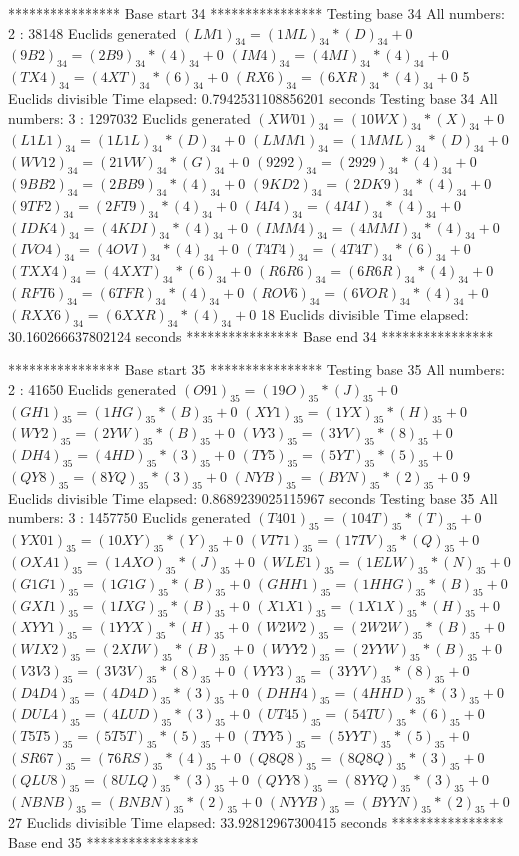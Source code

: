**************** Base start 34 ****************
Testing base 34 All numbers: 2 :
	 38148 Euclids generated
	$(LM1)_{34}=(1ML)_{34}*(D)_{34}+0$
	$(9B2)_{34}=(2B9)_{34}*(4)_{34}+0$
	$(IM4)_{34}=(4MI)_{34}*(4)_{34}+0$
	$(TX4)_{34}=(4XT)_{34}*(6)_{34}+0$
	$(RX6)_{34}=(6XR)_{34}*(4)_{34}+0$
	 5 Euclids divisible
Time elapsed: 0.7942531108856201 seconds
Testing base 34 All numbers: 3 :
	 1297032 Euclids generated
	$(XW01)_{34}=(10WX)_{34}*(X)_{34}+0$
	$(L1L1)_{34}=(1L1L)_{34}*(D)_{34}+0$
	$(LMM1)_{34}=(1MML)_{34}*(D)_{34}+0$
	$(WV12)_{34}=(21VW)_{34}*(G)_{34}+0$
	$(9292)_{34}=(2929)_{34}*(4)_{34}+0$
	$(9BB2)_{34}=(2BB9)_{34}*(4)_{34}+0$
	$(9KD2)_{34}=(2DK9)_{34}*(4)_{34}+0$
	$(9TF2)_{34}=(2FT9)_{34}*(4)_{34}+0$
	$(I4I4)_{34}=(4I4I)_{34}*(4)_{34}+0$
	$(IDK4)_{34}=(4KDI)_{34}*(4)_{34}+0$
	$(IMM4)_{34}=(4MMI)_{34}*(4)_{34}+0$
	$(IVO4)_{34}=(4OVI)_{34}*(4)_{34}+0$
	$(T4T4)_{34}=(4T4T)_{34}*(6)_{34}+0$
	$(TXX4)_{34}=(4XXT)_{34}*(6)_{34}+0$
	$(R6R6)_{34}=(6R6R)_{34}*(4)_{34}+0$
	$(RFT6)_{34}=(6TFR)_{34}*(4)_{34}+0$
	$(ROV6)_{34}=(6VOR)_{34}*(4)_{34}+0$
	$(RXX6)_{34}=(6XXR)_{34}*(4)_{34}+0$
	 18 Euclids divisible
Time elapsed: 30.160266637802124 seconds
**************** Base end 34 ****************

**************** Base start 35 ****************
Testing base 35 All numbers: 2 :
	 41650 Euclids generated
	$(O91)_{35}=(19O)_{35}*(J)_{35}+0$
	$(GH1)_{35}=(1HG)_{35}*(B)_{35}+0$
	$(XY1)_{35}=(1YX)_{35}*(H)_{35}+0$
	$(WY2)_{35}=(2YW)_{35}*(B)_{35}+0$
	$(VY3)_{35}=(3YV)_{35}*(8)_{35}+0$
	$(DH4)_{35}=(4HD)_{35}*(3)_{35}+0$
	$(TY5)_{35}=(5YT)_{35}*(5)_{35}+0$
	$(QY8)_{35}=(8YQ)_{35}*(3)_{35}+0$
	$(NYB)_{35}=(BYN)_{35}*(2)_{35}+0$
	 9 Euclids divisible
Time elapsed: 0.8689239025115967 seconds
Testing base 35 All numbers: 3 :
	 1457750 Euclids generated
	$(T401)_{35}=(104T)_{35}*(T)_{35}+0$
	$(YX01)_{35}=(10XY)_{35}*(Y)_{35}+0$
	$(VT71)_{35}=(17TV)_{35}*(Q)_{35}+0$
	$(OXA1)_{35}=(1AXO)_{35}*(J)_{35}+0$
	$(WLE1)_{35}=(1ELW)_{35}*(N)_{35}+0$
	$(G1G1)_{35}=(1G1G)_{35}*(B)_{35}+0$
	$(GHH1)_{35}=(1HHG)_{35}*(B)_{35}+0$
	$(GXI1)_{35}=(1IXG)_{35}*(B)_{35}+0$
	$(X1X1)_{35}=(1X1X)_{35}*(H)_{35}+0$
	$(XYY1)_{35}=(1YYX)_{35}*(H)_{35}+0$
	$(W2W2)_{35}=(2W2W)_{35}*(B)_{35}+0$
	$(WIX2)_{35}=(2XIW)_{35}*(B)_{35}+0$
	$(WYY2)_{35}=(2YYW)_{35}*(B)_{35}+0$
	$(V3V3)_{35}=(3V3V)_{35}*(8)_{35}+0$
	$(VYY3)_{35}=(3YYV)_{35}*(8)_{35}+0$
	$(D4D4)_{35}=(4D4D)_{35}*(3)_{35}+0$
	$(DHH4)_{35}=(4HHD)_{35}*(3)_{35}+0$
	$(DUL4)_{35}=(4LUD)_{35}*(3)_{35}+0$
	$(UT45)_{35}=(54TU)_{35}*(6)_{35}+0$
	$(T5T5)_{35}=(5T5T)_{35}*(5)_{35}+0$
	$(TYY5)_{35}=(5YYT)_{35}*(5)_{35}+0$
	$(SR67)_{35}=(76RS)_{35}*(4)_{35}+0$
	$(Q8Q8)_{35}=(8Q8Q)_{35}*(3)_{35}+0$
	$(QLU8)_{35}=(8ULQ)_{35}*(3)_{35}+0$
	$(QYY8)_{35}=(8YYQ)_{35}*(3)_{35}+0$
	$(NBNB)_{35}=(BNBN)_{35}*(2)_{35}+0$
	$(NYYB)_{35}=(BYYN)_{35}*(2)_{35}+0$
	 27 Euclids divisible
Time elapsed: 33.92812967300415 seconds
**************** Base end 35 ****************

